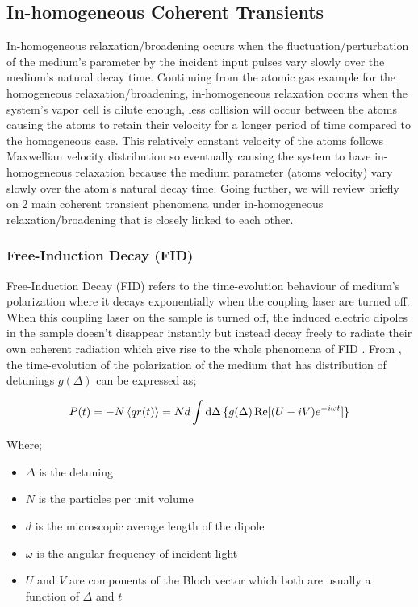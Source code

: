 \subsection{In-homogeneous Coherent Transients}
In-homogeneous relaxation/broadening occurs when the fluctuation/perturbation of the medium's parameter by the incident input pulses vary slowly over the medium's natural decay time. Continuing from the atomic gas example for the homogeneous relaxation/broadening, in-homogeneous relaxation occurs when the system's vapor cell is dilute enough, less collision will occur between the atoms causing the atoms to retain their velocity for a longer period of time compared to the homogeneous case. This relatively constant velocity of the atoms follows Maxwellian velocity distribution so eventually causing the system to have in-homogeneous relaxation because the medium parameter (atoms velocity) vary slowly over the atom's natural decay time. Going further, we will review briefly on 2 main coherent transient phenomena under in-homogeneous relaxation/broadening that is closely linked to each other.

\subsubsection{Free-Induction Decay (FID)}
Free-Induction Decay (FID) refers to the time-evolution behaviour of medium's polarization where it decays exponentially when the coupling laser are turned off. When this coupling laser on the sample is turned off, the induced electric dipoles in the sample doesn't disappear instantly but instead decay freely to radiate their own coherent radiation which give rise to the whole phenomena of FID \cite{Chen2010}. From \cite{Meystre2006}, the time-evolution of the polarization of the medium that has distribution of detunings $g(\Delta)$ can be expressed as;

\begin{equation}
    P(t) = - N \expval{q r(t)} = Nd \int \dd{\Delta} \{g(\Delta) \Re[(U - i V) e^{-i\omega t}] \}
\end{equation}

Where;

\begin{itemize}
    \item $\Delta$ is the detuning
    \item $N$ is the particles per unit volume
    \item $d$ is the microscopic average length of the dipole
    \item $\omega$ is the angular frequency of incident light
    \item $U$ and $V$ are components of the Bloch vector which both are usually a function of $\Delta$ and $t$
\end{itemize}

